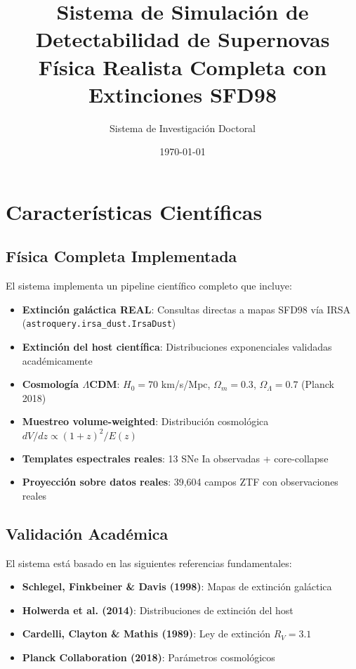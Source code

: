 \documentclass[11pt,a4paper]{article}
\title{\textbf{Sistema de Simulación de Detectabilidad de Supernovas}\\
\large{Física Realista Completa con Extinciones SFD98}}
\author{Sistema de Investigación Doctoral}
\date{\today}
\begin{document}
\maketitle

\section{Características Científicas}

\subsection{Física Completa Implementada}

El sistema implementa un pipeline científico completo que incluye:

\begin{itemize}
    \item \textbf{Extinción galáctica REAL}: Consultas directas a mapas SFD98 vía IRSA (\texttt{astroquery.irsa\_dust.IrsaDust})
    \item \textbf{Extinción del host científica}: Distribuciones exponenciales validadas académicamente
    \item \textbf{Cosmología $\Lambda$CDM}: $H_0 = 70$ km/s/Mpc, $\Omega_m = 0.3$, $\Omega_\Lambda = 0.7$ (Planck 2018)
    \item \textbf{Muestreo volume-weighted}: Distribución cosmológica $dV/dz \propto (1+z)^2/E(z)$
    \item \textbf{Templates espectrales reales}: 13 SNe Ia observadas + core-collapse
    \item \textbf{Proyección sobre datos reales}: 39,604 campos ZTF con observaciones reales
\end{itemize}

\subsection{Validación Académica}

El sistema está basado en las siguientes referencias fundamentales:

\begin{itemize}
    \item \textbf{Schlegel, Finkbeiner \& Davis (1998)}: Mapas de extinción galáctica
    \item \textbf{Holwerda et al. (2014)}: Distribuciones de extinción del host
    \item \textbf{Cardelli, Clayton \& Mathis (1989)}: Ley de extinción $R_V = 3.1$
    \item \textbf{Planck Collaboration (2018)}: Parámetros cosmológicos
\end{itemize}
\end{document}

